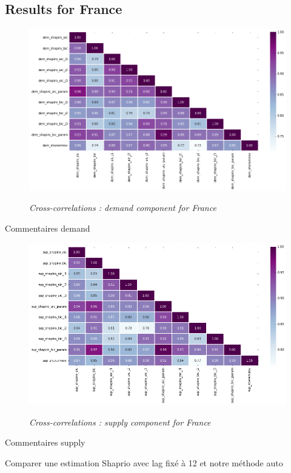 \subsection{Results for France}

\begin{figure}[h!]
    \centering
    \caption{\textit{Cross-correlations : demand component for France}}
    \includegraphics[width=1\textwidth]{img/dem_heat.png}
    \label{figure:dem_heat}
\end{figure}

Commentaires demand

\newpage

\begin{figure}[h!]
    \centering
    \caption{\textit{Cross-correlations : supply component for France}}
    \includegraphics[width=1\textwidth]{img/sup_heat.png}
    \label{figure:sup_heat}
\end{figure}

Commentaires supply

Comparer une estimation Shaprio avec lag fixé à 12 et notre méthode auto